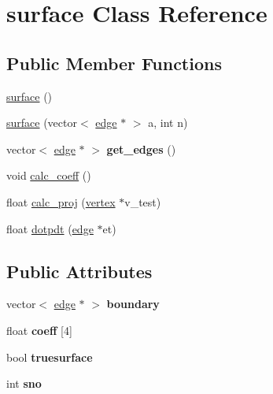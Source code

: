 \hypertarget{classsurface}{}\section{surface Class Reference}
\label{classsurface}
\subsection*{Public Member Functions}
\begin{DoxyCompactItemize}
\item 
\hyperlink{classsurface_ab5fc521a35b0534321d79457e76e0f85}{surface} ()
\item 
\hyperlink{classsurface_a6b62703f78edbec9cb201964311afab6}{surface} (vector$<$ \hyperlink{classedge}{edge} $\ast$ $>$ a, int n)
\item 
vector$<$ \hyperlink{classedge}{edge} $\ast$ $>$ {\bfseries get\+\_\+edges} ()\hypertarget{classsurface_a10bfc38e4399141f97ed0f70fc9f58be}{}\label{classsurface_a10bfc38e4399141f97ed0f70fc9f58be}

\item 
void \hyperlink{classsurface_af24522c6cefc4ed25fabaa2a0c796116}{calc\+\_\+coeff} ()
\item 
float \hyperlink{classsurface_a2d6866c8a780e857383b197dd550d4e6}{calc\+\_\+proj} (\hyperlink{classvertex}{vertex} $\ast$v\+\_\+test)
\item 
float \hyperlink{classsurface_ab781e1c11c1aa6e1c7ea473613d9eb8e}{dotpdt} (\hyperlink{classedge}{edge} $\ast$et)
\end{DoxyCompactItemize}
\subsection*{Public Attributes}
\begin{DoxyCompactItemize}
\item 
vector$<$ \hyperlink{classedge}{edge} $\ast$ $>$ {\bfseries boundary}\hypertarget{classsurface_afb5f24fab877b9c186137569fbb5f479}{}\label{classsurface_afb5f24fab877b9c186137569fbb5f479}

\item 
float {\bfseries coeff} \mbox{[}4\mbox{]}\hypertarget{classsurface_ab538767b396164d7f7d248be2c729993}{}\label{classsurface_ab538767b396164d7f7d248be2c729993}

\item 
bool {\bfseries truesurface}\hypertarget{classsurface_a2c3ab2c11d7522c3b208a9a75d6f0bab}{}\label{classsurface_a2c3ab2c11d7522c3b208a9a75d6f0bab}

\item 
int {\bfseries sno}\hypertarget{classsurface_a4918b483604feb44f3ab93a4272c9da8}{}\label{classsurface_a4918b483604feb44f3ab93a4272c9da8}

\end{DoxyCompactItemize}


